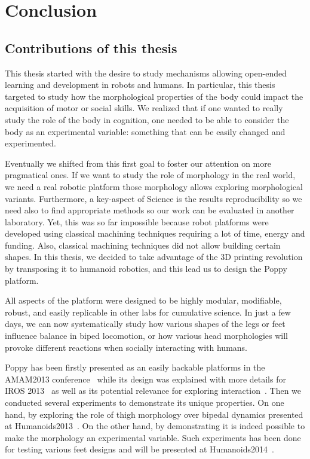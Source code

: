 
\chapter{Conclusion} %
\label{cha:conclusion}


\section{Contributions of this thesis} %
\label{sec:rappel_des_contributions}

This thesis started with the desire to study mechanisms allowing open-ended learning and development in robots and humans. In particular, this thesis targeted to study how the morphological properties of the body could impact the acquisition of motor or social skills.
We realized that if one wanted to really study the role of the body in cognition, one needed to be able to consider the body as an experimental variable: something that can be easily changed and experimented.

Eventually we shifted from this first goal to foster our attention on more pragmatical ones. If we want to study the role of morphology in the real world, we need a real robotic platform those morphology allows exploring morphological variants. Furthermore, a key-aspect of Science is the results reproducibility so we need also to find appropriate methods so our work can be evaluated in another laboratory.
Yet, this was so far impossible because robot platforms were developed using classical machining techniques requiring a lot of time, energy and funding. Also, classical machining techniques did not allow building certain shapes. In this thesis, we decided to take advantage of the 3D printing revolution by transposing it to humanoid robotics, and this lead us to design the Poppy platform.

All aspects of the platform were designed to be highly modular, modifiable, robust, and easily replicable in other labs for cumulative science. In just a few days, we can now systematically study how various shapes of the legs or feet influence balance in biped locomotion, or how various head morphologies will provoke different reactions when socially interacting with humans.

Poppy has been firstly presented as an easily hackable platforms in the AMAM2013 conference~\parencite{REF} while its design was explained with more details for IROS 2013~\parencite{REF} as well as its potential relevance for exploring interaction~\parencite{REF}. Then we conducted several experiments to demonstrate its unique properties. On one hand, by exploring the role of thigh morphology over bipedal dynamics presented at Humanoids2013~\parencite{REF}. On the other hand, by demonstrating it is indeed possible to make the morphology an experimental variable. Such experiments has been done for testing various feet designs and will be presented at Humanoids2014~\parencite{REF}.

